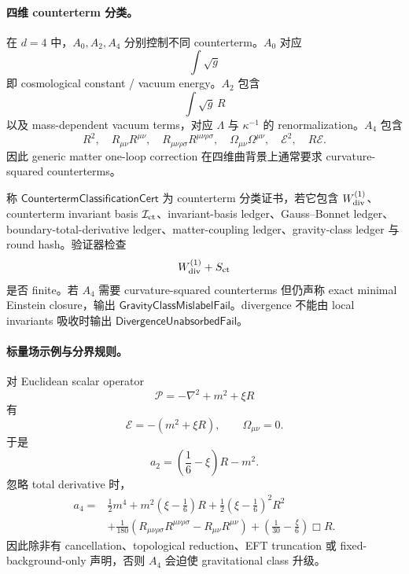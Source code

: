 \paragraph{四维 counterterm 分类。}
在 \(d=4\) 中，\(A_0,A_2,A_4\) 分别控制不同 counterterm。\(A_0\) 对应
\[
\int\sqrt g
\]
即 cosmological constant / vacuum energy。\(A_2\) 包含
\[
\int\sqrt g\,R
\]
以及 mass-dependent vacuum terms，对应 \(\Lambda\) 与 \(\kappa^{-1}\) 的 renormalization。\(A_4\) 包含
\[
R^2,\quad
R_{\mu\nu}R^{\mu\nu},\quad
R_{\mu\nu\rho\sigma}R^{\mu\nu\rho\sigma},\quad
\Omega_{\mu\nu}\Omega^{\mu\nu},
\quad
\mathcal E^2,
\quad
R\mathcal E.
\]
因此 generic matter one-loop correction 在四维曲背景上通常要求 curvature-squared counterterms。

\begin{definition}\label{def:typed-address-biaxial-completion-counterterm-classification-cert}
称 \(\mathsf{CountertermClassificationCert}\) 为 counterterm 分类证书，若它包含 \(W_{\rm div}^{(1)}\)、counterterm invariant basis \(\mathcal I_{\rm ct}\)、invariant-basis ledger、Gauss--Bonnet ledger、boundary-total-derivative ledger、matter-coupling ledger、gravity-class ledger 与 round hash。验证器检查
\[
W_{\rm div}^{(1)}+S_{\rm ct}
\]
是否 finite。若 \(A_4\) 需要 curvature-squared counterterms 但仍声称 exact minimal Einstein closure，输出 \(\mathsf{GravityClassMislabelFail}\)。divergence 不能由 local invariants 吸收时输出 \(\mathsf{DivergenceUnabsorbedFail}\)。
\end{definition}

\paragraph{标量场示例与分界规则。}
对 Euclidean scalar operator
\[
\mathcal P=-\nabla^2+m^2+\xi R
\]
有
\[
\mathcal E=-(m^2+\xi R),
\qquad
\Omega_{\mu\nu}=0.
\]
于是
\[
a_2=
\left(\frac16-\xi\right)R-m^2.
\]
忽略 total derivative 时，
\[
\begin{aligned}
a_4={}&
\frac12m^4
+m^2\left(\xi-\frac16\right)R
+\frac12\left(\xi-\frac16\right)^2R^2\\
&+
\frac1{180}
\left(
R_{\mu\nu\rho\sigma}R^{\mu\nu\rho\sigma}
-
R_{\mu\nu}R^{\mu\nu}
\right)
+\left(\frac1{30}-\frac{\xi}{6}\right)\Box R.
\end{aligned}
\]
因此除非有 cancellation、topological reduction、EFT truncation 或 fixed-background-only 声明，否则 \(A_4\) 会迫使 gravitational class 升级。

